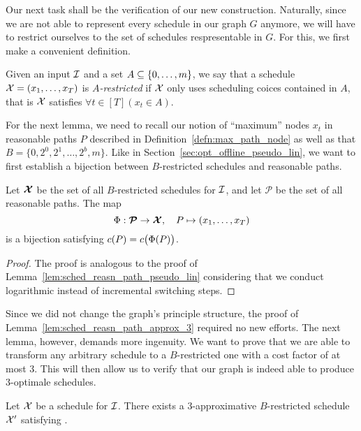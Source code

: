 Our next task shall be the verification of our new construction. Naturally, since we are not able to represent every schedule in our graph $G$ anymore, we will have to restrict ourselves to the set of schedules respresentable in $G$. For this, we first make a convenient definition.
\begin{defn}
Given an input $\mathcal{I}$ and a set $A\subseteq\{0,\ldots,m\}$, we say that a schedule $\mathcal{X}=(x_1,\ldots,x_T)$ is \textit{$A$-restricted} if $\mathcal{X}$ only uses scheduling coices contained in $A$, that is $\mathcal{X}$ satisfies $\forall t\in[T](x_t\in A)$.
\end{defn}
For the next lemma, we need to recall our notion of ``maximum'' nodes $x_t$ in reasonable paths $P$ described in Definition~\ref{defn:max_path_node} as well as that $B=\{0,2^0,2^1,\ldots,2^b,m\}$. Like in Section~\ref{sec:opt_offline_pseudo_lin}, we want to first establish a bijection between $B$-restricted schedules and reasonable paths.
\begin{lem}\label{lem:sched_reasn_path_approx_3}
Let $\bm{\mathcal{X}}$ be the set of all $B$-restricted schedules for $\mathcal{I}$, and let $\bm{\mathcal{P}}$ be the set of all reasonable paths. The map
\begin{equation*}
	\Phi:\bm{\mathcal{P}}\rightarrow\bm{\mathcal{X}},\quad P\mapsto (x_1,\ldots,x_T)
\end{equation*}
is a bijection satisfying $c(P)=c\bigl(\Phi(P)\bigr)$.
\end{lem}
\begin{proof}
The proof is analogous to the proof of Lemma~\ref{lem:sched_reasn_path_pseudo_lin} considering that we conduct logarithmic instead of incremental switching steps.
\end{proof}
Since we did not change the graph's principle structure, the proof of Lemma~\ref{lem:sched_reasn_path_approx_3} required no new efforts. The next lemma, however, demands more ingenuity. We want to prove that we are able to transform any arbitrary schedule to a $B$-restricted one with a cost factor of at most 3. This will then allow us to verify that our graph is indeed able to produce 3-optimale schedules.
\begin{lem}\label{lem:transform_schedule_approx_3}
Let $\mathcal{X}$ be a schedule for $\mathcal{I}$. There exists a 3-approximative $B$-restricted schedule $\mathcal{X}'$ satisfying .
\end{lem}
